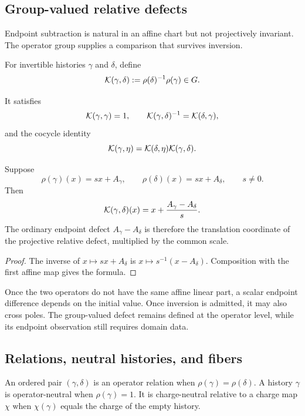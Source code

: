 \subsection{Group-valued relative defects}

Endpoint subtraction is natural in an affine chart but not projectively
invariant.  The operator group supplies a comparison that survives inversion.

\begin{definition}
For invertible histories $\gamma$ and $\delta$, define
\begin{equation}
  \mathcal K(\gamma,\delta)
  \mathrel{:=} \rho(\delta)^{-1}\rho(\gamma)\in G.
  \label{eq:relative-projective-defect}
\end{equation}
\end{definition}
It satisfies
\[
  \mathcal K(\gamma,\gamma)=1,
  \qquad
  \mathcal K(\gamma,\delta)^{-1}=\mathcal K(\delta,\gamma),
\]
and the cocycle identity
\begin{equation}
  \mathcal K(\gamma,\eta)
  =\mathcal K(\delta,\eta)\mathcal K(\gamma,\delta).
  \label{eq:defect-cocycle}
\end{equation}

\begin{proposition}
Suppose
\[
  \rho(\gamma)(x)=sx+A_\gamma,
  \qquad
  \rho(\delta)(x)=sx+A_\delta,
  \qquad s\ne0.
\]
Then
\[
  \mathcal K(\gamma,\delta)(x)=x+\frac{A_\gamma-A_\delta}{s}.
\]
The ordinary endpoint defect $A_\gamma-A_\delta$ is therefore the translation
coordinate of the projective relative defect, multiplied by the common scale.
\end{proposition}
\begin{proof}
The inverse of $x\mapsto sx+A_\delta$ is
$x\mapsto s^{-1}(x-A_\delta)$.  Composition with the first affine map gives
the formula.
\end{proof}

Once the two operators do not have the same affine linear part, a scalar
endpoint difference depends on the initial value.  Once inversion is admitted,
it may also cross poles.  The group-valued defect remains defined at the
operator level, while its endpoint observation still requires domain data.

\subsection{Relations, neutral histories, and fibers}

\begin{definition}
An ordered pair $(\gamma,\delta)$ is an operator relation when
$\rho(\gamma)=\rho(\delta)$.  A history $\gamma$ is operator-neutral when
$\rho(\gamma)=1$.  It is charge-neutral relative to a charge map $\chi$ when
$\chi(\gamma)$ equals the charge of the empty history.
\end{definition}

